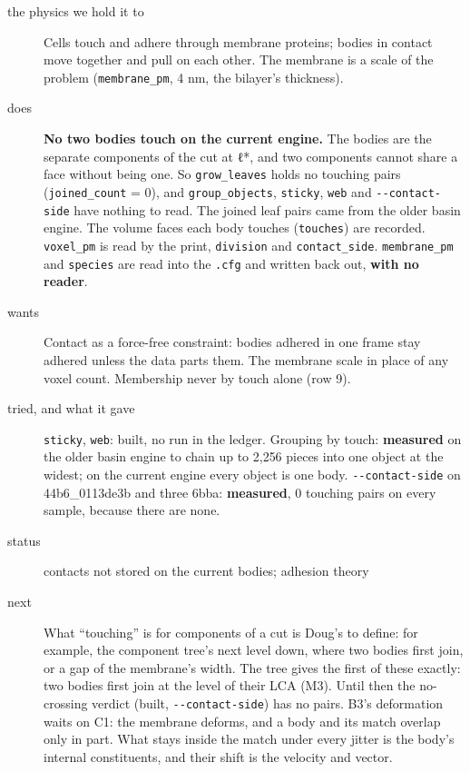 \begin{description}
\item[{the physics we hold it to}] Cells touch and adhere through membrane proteins; bodies in contact move together and pull on each other. The membrane is a scale of the problem (\texttt{membrane\_\allowbreak{}pm}, 4 nm, the bilayer's thickness).
\item[{does}] \textbf{No two bodies touch on the current engine.} The bodies are the separate components of the cut at ℓ*, and two components cannot share a face without being one. So \texttt{grow\_\allowbreak{}leaves} holds no touching pairs (\texttt{joined\_\allowbreak{}count} = 0), and \texttt{group\_\allowbreak{}objects}, \texttt{sticky}, \texttt{web} and \texttt{-\allowbreak{}-\allowbreak{}contact-\allowbreak{}side} have nothing to read. The joined leaf pairs came from the older basin engine. The volume faces each body touches (\texttt{touches}) are recorded. \texttt{voxel\_\allowbreak{}pm} is read by the print, \texttt{division} and \texttt{contact\_\allowbreak{}side}. \texttt{membrane\_\allowbreak{}pm} and \texttt{species} are read into the \texttt{.\allowbreak{}cfg} and written back out, \textbf{with no reader}.
\item[{wants}] Contact as a force-free constraint: bodies adhered in one frame stay adhered unless the data parts them. The membrane scale in place of any voxel count. Membership never by touch alone (row 9).
\item[{tried, and what it gave}] \texttt{sticky}, \texttt{web}: built, no run in the ledger. Grouping by touch: \textbf{measured} on the older basin engine to chain up to 2,256 pieces into one object at the widest; on the current engine every object is one body. \texttt{-\allowbreak{}-\allowbreak{}contact-\allowbreak{}side} on 44b6\_\allowbreak{}0113de3b and three 6bba: \textbf{measured}, 0 touching pairs on every sample, because there are none.
\item[{status}] contacts not stored on the current bodies; adhesion theory
\item[{next}] What “touching” is for components of a cut is Doug's to define: for example, the component tree's next level down, where two bodies first join, or a gap of the membrane's width. The tree gives the first of these exactly: two bodies first join at the level of their LCA (M3). Until then the no-crossing verdict (built, \texttt{-\allowbreak{}-\allowbreak{}contact-\allowbreak{}side}) has no pairs. B3's deformation waits on C1: the membrane deforms, and a body and its match overlap only in part. What stays inside the match under every jitter is the body's internal constituents, and their shift is the velocity and vector.
\end{description}

